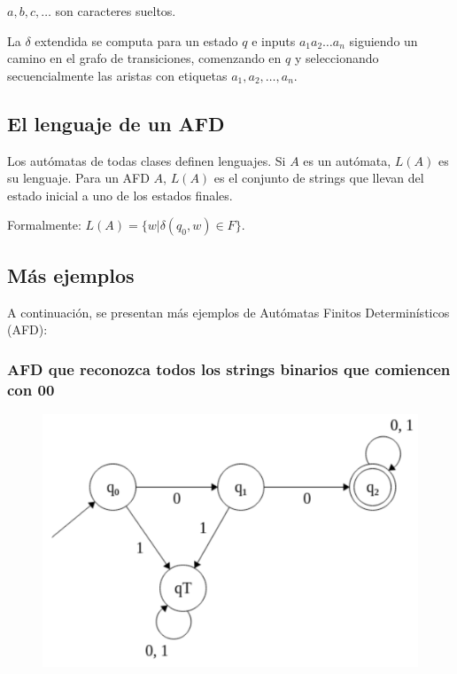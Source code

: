 \documentclass[11pt]{article}
\begin{document}
    $a, b, c, \ldots$ son caracteres sueltos.

    La $\delta$ extendida se computa para un estado $q$ e inputs $a_1a_2 \ldots a_n$ siguiendo un camino en el grafo de transiciones, comenzando en $q$ y seleccionando secuencialmente las aristas con etiquetas $a_1, a_2, \ldots, a_n$.

    \subsection{El lenguaje de un AFD}

    Los autómatas de todas clases definen lenguajes. Si $A$ es un autómata, $L(A)$ es su lenguaje. Para un AFD $A$, $L(A)$ es el conjunto de strings que llevan del estado inicial a uno de los estados finales.

    Formalmente: $L(A) = \{w | \delta(q_0, w) \in F\}$.

    \subsection{Más ejemplos}

    A continuación, se presentan más ejemplos de Autómatas Finitos Determinísticos (AFD):

    \subsubsection{AFD que reconozca todos los strings binarios que comiencen con 00}

    \begin{figure}[H]
        \centering
        \includegraphics[width=\textwidth]{img/afd/afd-6}\label{fig:figure6}
    \end{figure}
\end{document}
